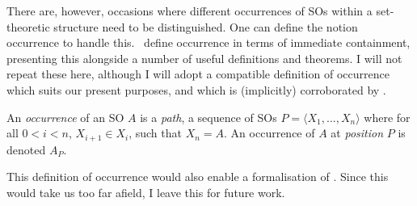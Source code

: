 There are, however, occasions where different occurrences of SOs within a set-theoretic structure need to be distinguished. One can define the notion occurrence to handle this. \CS\ define occurrence in terms of immediate containment, presenting this alongside a number of useful definitions and theorems. I will not repeat these here, although I will adopt a compatible definition of occurrence which suits our present purposes, and which is (implicitly) corroborated by \textcite{EpsteinSD.etal_2020}.

\begin{definition}
    An \textit{occurrence} of an SO $A$ is a \textit{path}, a sequence of SOs $P = \langle X_1, ... , X_n \rangle$ where for all $0 < i < n$, $X_{i+1} \in X_i$, such that $X_n = A$. An occurrence of $A$ at \textit{position} $P$ is denoted $A_P$.
\end{definition}

This definition of occurrence would also enable a formalisation of \FormCopy. Since this would take us too far afield, I leave this for future work.
